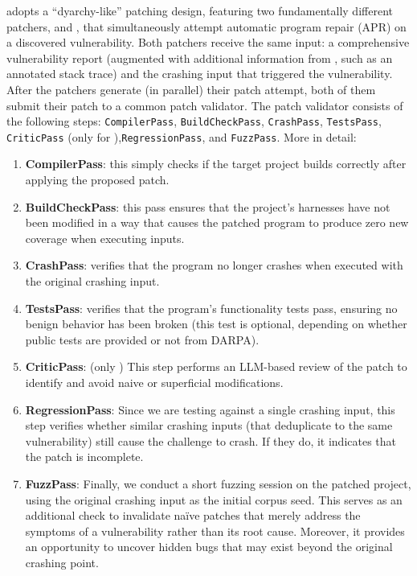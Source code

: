 \artiphishell adopts a “dyarchy-like” patching design, featuring two fundamentally different patchers, \patchery and \patcherq, that simultaneously attempt automatic program repair (APR) on a discovered vulnerability. 
Both patchers receive the same input: a comprehensive vulnerability report (augmented with additional information from \poiguy, such as an annotated stack trace) and the crashing input that triggered the vulnerability.
After the patchers generate (in parallel) their patch attempt, both of them submit their patch to a common patch validator.
The patch validator consists of the following steps:
\texttt{CompilerPass}, \texttt{BuildCheckPass}, \texttt{CrashPass}, \texttt{TestsPass}, \texttt{CriticPass} (only for \patcherq),\texttt{RegressionPass}, and \texttt{FuzzPass}.
More in detail:
\begin{enumerate}
    \item \textbf{CompilerPass}: this simply checks if the target project builds correctly after applying the proposed patch.
    \item \textbf{BuildCheckPass}: this pass ensures that the project’s harnesses have not been modified in a way that causes the patched program to produce zero new coverage when executing inputs.
    \item \textbf{CrashPass}: verifies that the program no longer crashes when executed with the original crashing input.
    \item \textbf{TestsPass}: verifies that the program’s functionality tests pass, ensuring no benign behavior has been broken (this test is optional, depending on whether public tests are provided or not from DARPA).
    \item \textbf{CriticPass}: (only \patcherq) This step performs an LLM-based review of the patch to identify and avoid naive or superficial modifications.
    \item \textbf{RegressionPass}: Since we are testing against a single crashing input, this step verifies whether similar crashing inputs (that deduplicate to the same vulnerability) still cause the challenge to crash. If they do, it indicates that the patch is incomplete.
    \item \textbf{FuzzPass}: Finally, we conduct a short fuzzing session on the patched project, using the original crashing input as the initial corpus seed. This serves as an additional check to invalidate naïve patches that merely address the symptoms of a vulnerability rather than its root cause. Moreover, it provides an opportunity to uncover hidden bugs that may exist beyond the original crashing point.
     
\end{enumerate}

